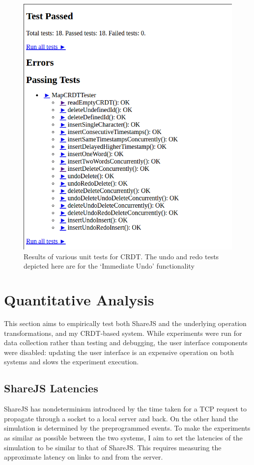 \documentclass[12pt,a4paper,twoside,openright]{report}
\begin{document}
	\begin{figure}[htb]
	\centering
	\includegraphics[width=0.7\linewidth]{figs/unittests.png}
	\caption[Unit tests for CRDT]{Results of various unit tests for CRDT. The undo and redo tests depicted here are for the `Immediate Undo' functionality}
	\label{fig:unittests}
	\end{figure}
	
	
	
	
	\section{Quantitative Analysis}
	
		This section aims to empirically test both ShareJS and the underlying operation transformations, and my CRDT-based system. While experiments were run for data collection rather than testing and debugging, the user interface components were disabled: updating the user interface is an expensive operation on both systems and slows the experiment execution.
		
		\subsection{ShareJS Latencies}
			ShareJS has nondeterminism introduced by the time taken for a TCP request to propagate through a socket to a local server and back. On the other hand the simulation is determined by the preprogrammed events. To make the experiments as similar as possible between the two systems, I aim to set the latencies of the simulation to be similar to that of ShareJS. This requires measuring the approximate latency on links to and from the server.
			
\end{document}
